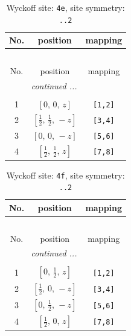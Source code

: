 \documentclass[fleqn,8pt]{jsarticle}
\begin{document}
\begin{longtable}{ccc}
\caption{Wyckoff site: {\tt 4e}, site symmetry: {\tt ..2}}
 \\
 \hline \hline
No. & position & mapping \\ \hline \endfirsthead

\multicolumn{2}{l}{\tablename\ \thetable{}} \\
 \hline \hline
No. & position & mapping \\ \hline \endhead

 \hline \hline
\multicolumn{2}{r}{\footnotesize\it continued ...} \\ \endfoot

 \hline \hline
\multicolumn{2}{r}{} \\ \endlastfoot

1 & $\left[ 0,\, 0,\, z \right]$ & {\tt [1,2]} \\ \hline
2 & $\left[ \frac{1}{2},\, \frac{1}{2},\, - z \right]$ & {\tt [3,4]} \\ \hline
3 & $\left[ 0,\, 0,\, - z \right]$ & {\tt [5,6]} \\ \hline
4 & $\left[ \frac{1}{2},\, \frac{1}{2},\, z \right]$ & {\tt [7,8]} \\
\end{longtable}
\renewcommand{\arraystretch}{1.2}
\begin{longtable}{ccc}
\caption{Wyckoff site: {\tt 4f}, site symmetry: {\tt ..2}}
 \\
 \hline \hline
No. & position & mapping \\ \hline \endfirsthead

\multicolumn{2}{l}{\tablename\ \thetable{}} \\
 \hline \hline
No. & position & mapping \\ \hline \endhead

 \hline \hline
\multicolumn{2}{r}{\footnotesize\it continued ...} \\ \endfoot

 \hline \hline
\multicolumn{2}{r}{} \\ \endlastfoot

1 & $\left[ 0,\, \frac{1}{2},\, z \right]$ & {\tt [1,2]} \\ \hline
2 & $\left[ \frac{1}{2},\, 0,\, - z \right]$ & {\tt [3,4]} \\ \hline
3 & $\left[ 0,\, \frac{1}{2},\, - z \right]$ & {\tt [5,6]} \\ \hline
4 & $\left[ \frac{1}{2},\, 0,\, z \right]$ & {\tt [7,8]} \\
\end{longtable}
\end{document}
